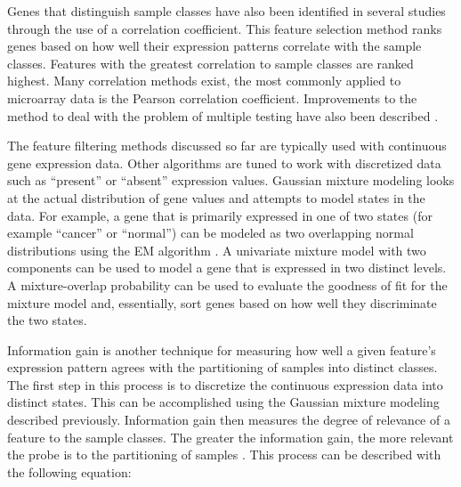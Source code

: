 {%

Genes that distinguish sample classes have also been identified in several
studies through the use of a correlation coefficient.  This feature selection
method ranks genes based on how well their expression patterns correlate with
the sample classes.  Features with the greatest correlation to sample classes
are ranked highest.  Many correlation methods exist, the most commonly applied
to microarray data is the Pearson correlation coefficient. Improvements to the
method to deal with the problem of multiple testing have also been described
\cite{dudoit2002smi}.






The feature filtering methods discussed so far are typically used with
continuous gene expression data.  Other algorithms are tuned to work with
discretized data such as ``present'' or ``absent'' expression values. Gaussian
mixture modeling looks at the actual distribution of gene values and attempts
to model states in the data.  For example, a gene that is primarily expressed
in one of two states (for example ``cancer'' or ``normal'') can be modeled as
two overlapping normal distributions using the EM algorithm
\cite{dempster1977mli}.  A univariate mixture model with two components can be
used to model a gene that is expressed in two distinct levels.  A
mixture-overlap probability can be used to evaluate the goodness of fit for the
mixture model and, essentially, sort genes based on how well they discriminate
the two states.



Information gain is another technique for measuring how well a given feature's
expression pattern agrees with the partitioning of samples into distinct
classes. The first step in this process is to discretize the continuous
expression data into distinct states.  This can be accomplished using the
Gaussian mixture modeling described previously.  Information gain then measures
the degree of relevance of a feature to the sample classes.  The greater the
information gain, the more relevant the probe is to the partitioning of samples
\cite{cover1991eit}. This process can be described with the following equation:

}
